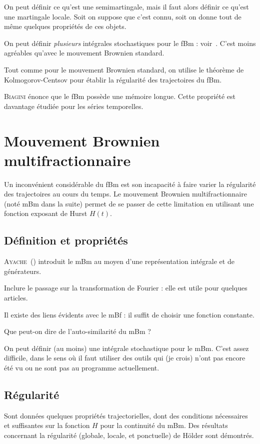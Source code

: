 \begin{prerequis}
  On peut définir ce qu'est une semimartingale, mais il faut alors
  définir ce qu'est une martingale locale. Soit on suppose que c'est
  connu, soit on donne tout de même quelques propriétés de ces objets.
\end{prerequis}

On peut définir \emph{plusieurs} intégrales stochastiques pour le fBm
: voir~\cite[Chp.~II-V]{biagini2008}. C'est moins agréables qu'avec le
mouvement Brownien standard.

Tout comme pour le mouvement Brownien standard, on utilise le théorème
de Kolmogorov-Centsov pour établir la régularité des trajectoires du
fBm.

\begin{alert}
  \textsc{Biagini} énonce que le fBm possède une mémoire longue. Cette
  propriété est davantage étudiée pour les séries temporelles.
\end{alert}

\section{Mouvement Brownien multifractionnaire}
Un inconvénient considérable du fBm est son incapacité à faire varier
la régularité des trajectoires au cours du temps. Le mouvement
Brownien multifractionnaire (noté mBm dans la suite) permet de se
passer de cette limitation en utilisant une fonction exposant de Hurst
$H(t)$.

\subsection{Définition et propriétés}
\textsc{Ayache}~(\cite{ayache2018}) introduit le mBm au moyen d'une
représentation intégrale et de générateurs.

\begin{prerequis}
  Inclure le passage sur la transformation de Fourier : elle est utile
  pour quelques articles.
\end{prerequis}

Il existe des liens évidents avec le mBf : il suffit de choisir une
fonction constante.

\begin{question}
  Que peut-on dire de l'auto-similarité du mBm ?
\end{question}

\begin{prerequis}
  On peut définir (au moins) une intégrale stochastique pour le
  mBm. C'est assez difficile, dans le sens où il faut utiliser des
  outils qui (je crois) n'ont pas encore été vu ou ne sont pas au
  programme actuellement.
\end{prerequis}

\subsection{Régularité}
Sont données quelques propriétés trajectorielles, dont des conditions
nécessaires et suffisantes sur la fonction $H$ pour la continuité du
mBm. Des résultats concernant la régularité (globale, locale, et
ponctuelle) de Hölder sont démontrés.